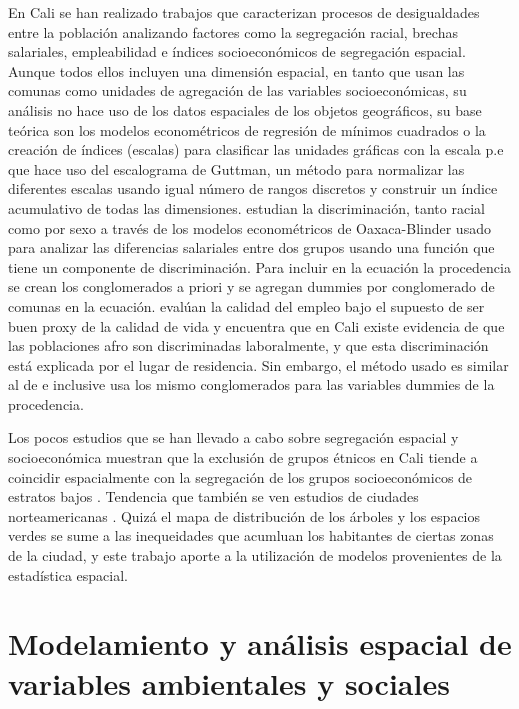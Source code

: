 \documentclass[12pt,]{book}
\begin{document}
En Cali se han realizado trabajos que caracterizan procesos de
desigualdades entre la población analizando factores como la segregación
racial, brechas salariales, empleabilidad e índices socioeconómicos de
segregación
espacial\citep{arroyo_mina_afrocolombianos_2016, mora_brechas_2014, ceron_indice_2014}.
Aunque todos ellos incluyen una dimensión espacial, en tanto que usan
las comunas como unidades de agregación de las variables
socioeconómicas, su análisis no hace uso de los datos espaciales de los
objetos geográficos, su base teórica son los modelos econométricos de
regresión de mínimos cuadrados o la creación de índices (escalas) para
clasificar las unidades gráficas con la escala p.e
\citep{ceron_indice_2014} que hace uso del escalograma de Guttman, un
método para normalizar las diferentes escalas usando igual número de
rangos discretos y construir un índice acumulativo de todas las
dimensiones. \citet{mora_brechas_2014} estudian la discriminación, tanto
racial como por sexo a través de los modelos econométricos de
Oaxaca-Blinder usado para analizar las diferencias salariales entre dos
grupos usando una función que tiene un componente de discriminación.
Para incluir en la ecuación la procedencia se crean los conglomerados a
priori y se agregan dummies por conglomerado de comunas en la ecuación.
\citet{arroyo_mina_afrocolombianos_2016} evalúan la calidad del empleo
bajo el supuesto de ser buen proxy de la calidad de vida y encuentra que
en Cali existe evidencia de que las poblaciones afro son discriminadas
laboralmente, y que esta discriminación está explicada por el lugar de
residencia. Sin embargo, el método usado es similar al de
\citep{mora_brechas_2014} e inclusive usa los mismo conglomerados para
las variables dummies de la procedencia.

Los pocos estudios que se han llevado a cabo sobre segregación espacial
y socioeconómica muestran que la exclusión de grupos étnicos en Cali
tiende a coincidir espacialmente con la segregación de los grupos
socioeconómicos de estratos bajos \citep{ceron_indice_2014}. Tendencia
que también se ven estudios de ciudades norteamericanas
\citep{heynen_political_2006, landry_street_2009, zhou_social_2013, nesbitt_exploring_2016}.
Quizá el mapa de distribución de los árboles y los espacios verdes se
sume a las inequeidades que acumluan los habitantes de ciertas zonas de
la ciudad, y este trabajo aporte a la utilización de modelos
provenientes de la estadística espacial.

\section{Modelamiento y análisis espacial de variables ambientales y
sociales}\label{modelamiento-y-analisis-espacial-de-variables-ambientales-y-sociales}
\end{document}

